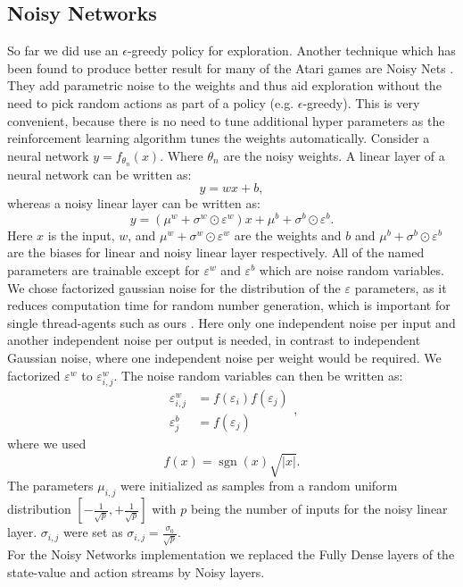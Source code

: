 \subsection{Noisy Networks}
So far we did use an $\epsilon$-greedy policy for exploration. Another technique which has been found to produce better result for many of the Atari games are Noisy Nets \cite{DBLP:journals/corr/FortunatoAPMOGM17}. They add parametric noise to the weights and thus aid exploration without the need to pick random actions as part of a policy (e.g. $\epsilon$-greedy). This is very convenient, because there is no need to tune additional hyper parameters as the reinforcement learning algorithm tunes the weights automatically.
Consider a neural network $y=f_{\theta_n}(x)$. Where $\theta_n$ are the noisy weights. A linear layer of a neural network can be written as: 
\begin{equation}
y = w x+b,
\end{equation}
whereas a noisy linear layer can be written as:
\begin{equation}
y =\left(\mu^{w}+\sigma^{w} \odot \varepsilon^{w}\right) x+\mu^{b}+\sigma^{b} \odot \varepsilon^{b}.
\end{equation}
Here $x$ is the input, $w$, and $\mu^{w}+\sigma^{w} \odot \varepsilon^{w}$ are the weights and $b$ and $\mu^{b}+\sigma^{b} \odot \varepsilon^{b}$ are the biases for linear and noisy linear layer respectively. All of the named parameters are trainable except for $\varepsilon^w$ and $\varepsilon^b$ which are noise random variables. We chose factorized gaussian noise for the distribution of the $\varepsilon$ parameters, as it reduces computation time for random number generation, which is important for single thread-agents such as ours \cite{DBLP:journals/corr/FortunatoAPMOGM17}. Here only one independent noise per input and another independent noise per output is needed, in contrast to independent Gaussian noise, where one independent noise per weight would be required.
We factorized $\varepsilon^w$ to $\varepsilon^w_{i,j}$.
The noise random variables can then be written as:
\begin{equation}
\begin{aligned} \varepsilon_{i, j}^{w} &=f\left(\varepsilon_{i}\right) f\left(\varepsilon_{j}\right) \\ \varepsilon_{j}^{b} &=f\left(\varepsilon_{j}\right) \end{aligned},
\end{equation}
where we used \begin{equation}
f(x)=\operatorname{sgn}(x) \sqrt{|x|}.
\end{equation}
The parameters $\mu_{i,j}$ were initialized as samples from a random uniform distribution $\left[-\frac{1}{\sqrt{p}},+\frac{1}{\sqrt{p}}\right]$ with $p$ being the number of inputs for the noisy linear layer. $\sigma_{i, j}$ were set as $\sigma_{i, j}=\frac{\sigma_{0}}{\sqrt{p}}$. \\
For the Noisy Networks implementation we replaced the Fully Dense layers of the state-value and action streams by Noisy layers. %
\cite{DBLP:journals/corr/FortunatoAPMOGM17}